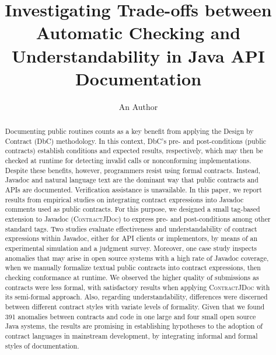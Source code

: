 \documentclass[a4paper,UKenglish]{lipics-v2018}
\title{Investigating Trade-offs between Automatic Checking and Understandability in Java API Documentation}
\author{An Author}{An Institution}{author@authors.com}{}{}
\newcommand{\contractjdoc}[1]{\textsc{ContractJDoc}}
\begin{document}
\maketitle

\begin{abstract}
Documenting public routines counts as a key benefit from applying the Design by Contract (DbC) methodology. 
In this context, DbC's pre- and post-conditions (public contracts) establish conditions and expected results, respectively, which may then be checked at runtime for detecting invalid calls or nonconforming implementations.
%
Despite these benefits, however, programmers resist using formal contracts. Instead, Javadoc and natural language text are the dominant way that public contracts and APIs are documented.
Verification assistance is unavailable.
%
In this paper, we report results from empirical studies on integrating contract expressions into Javadoc comments used as public contracts. 
For this purpose, we designed a small tag-based extension to Javadoc (\contractjdoc{}) to express pre- and post-conditions among other standard tags.
%
Two studies evaluate effectiveness and understandability of contract expressions within Javadoc, either for API clients or implementors, by means of an experimental simulation and a judgment survey. Moreover, one case study inspects anomalies that may arise in open source systems with a high rate of Javadoc coverage, when we manually formalize textual public contracts into contract expressions, then checking conformance at runtime.
%
We observed the higher quality of submissions as contracts were less formal, with satisfactory results when applying \contractjdoc{} with its semi-formal approach. Also, regarding understandability, differences were discerned between different contract styles with variate levels of formality.
Given that we found 391 anomalies between contracts and code in one large and four small open source Java systems, the results are promising in establishing hypotheses to the adoption of contract languages in mainstream development, by integrating informal and formal styles of documentation.
\end{abstract}














\end{document}
